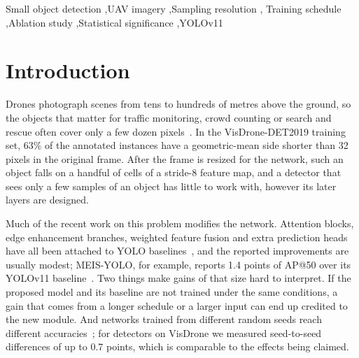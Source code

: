 \documentclass[preprint,12pt]{elsarticle}
\begin{document}
\begin{frontmatter}
\begin{keyword}
Small object detection \sep UAV imagery \sep Sampling resolution \sep
Training schedule \sep Ablation study \sep Statistical significance \sep YOLOv11
\end{keyword}

\end{frontmatter}

\section{Introduction}
\label{sec:intro}

Drones photograph scenes from tens to hundreds of metres above the ground, so the
objects that matter for traffic monitoring, crowd counting or search and rescue
often cover only a few dozen pixels~\cite{visdrone2019,uav-survey}. In the
VisDrone-DET2019 training set, 63\% of the annotated instances have a
geometric-mean side shorter than 32 pixels in the original frame. After the
frame is resized for the network, such an object falls on a handful of cells of
a stride-8 feature map, and a detector that sees only a few samples of an object
has little to work with, however its later layers are designed.

Much of the recent work on this problem modifies the network. Attention blocks,
edge enhancement branches, weighted feature fusion and extra prediction heads
have all been attached to YOLO baselines~\cite{tph-yolo,meis-yolo,cf-yolo}, and
the reported improvements are usually modest; MEIS-YOLO, for example, reports
1.4 points of AP@50 over its YOLOv11 baseline~\cite{meis-yolo}. Two things make
gains of that size hard to interpret. If the proposed model and its baseline are
not trained under the same conditions, a gain that comes from a longer schedule
or a larger input can end up credited to the new module. And networks trained
from different random seeds reach different
accuracies~\cite{bouthillier2021variance}; for detectors on VisDrone we measured
seed-to-seed differences of up to 0.7 points, which is comparable to the effects
being claimed.
\end{document}

